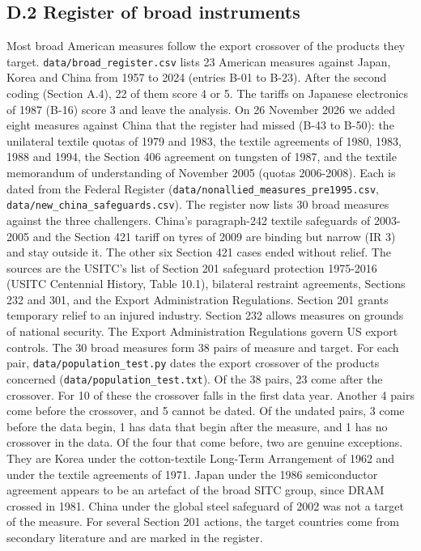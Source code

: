 \hypertarget{d.2-register-of-broad-instruments}{%
\subsection*{D.2 Register of broad
instruments}\label{d.2-register-of-broad-instruments}}

Most broad American measures follow the export crossover of the products
they target. \texttt{data/\allowbreak{}broad\_\allowbreak{}register.csv} lists 23 American
measures against Japan, Korea and China from 1957 to 2024 (entries B-01
to B-23). After the second coding (Section A.4), 22 of them score 4 or
5. The tariffs on Japanese electronics of 1987 (B-16) score 3 and leave
the analysis. On 26 November 2026 we added eight measures against China
that the register had missed (B-43 to B-50): the unilateral textile
quotas of 1979 and 1983, the textile agreements of 1980, 1983, 1988 and
1994, the Section 406 agreement on tungsten of 1987, and the textile
memorandum of understanding of November 2005 (quotas 2006-2008). Each is
dated from the Federal Register
(\texttt{data/\allowbreak{}nonallied\_\allowbreak{}measures\_\allowbreak{}pre1995.csv},
\texttt{data/\allowbreak{}new\_\allowbreak{}china\_\allowbreak{}safeguards.csv}). The register now lists 30
broad measures against the three challengers. China's paragraph-242
textile safeguards of 2003-2005 and the Section 421 tariff on tyres of
2009 are binding but narrow (IR 3) and stay outside it. The other six
Section 421 cases ended without relief. The sources are the USITC's list
of Section 201 safeguard protection 1975-2016 (USITC Centennial History,
Table 10.1), bilateral restraint agreements, Sections 232 and 301, and
the Export Administration Regulations. Section 201 grants temporary
relief to an injured industry. Section 232 allows measures on grounds of
national security. The Export Administration Regulations govern US
export controls. The 30 broad measures form 38 pairs of measure and
target. For each pair, \texttt{data/\allowbreak{}population\_\allowbreak{}test.py} dates the
export crossover of the products concerned
(\texttt{data/\allowbreak{}population\_\allowbreak{}test.txt}). Of the 38 pairs, 23 come after the
crossover. For 10 of these the crossover falls in the first data year.
Another 4 pairs come before the crossover, and 5 cannot be dated. Of the
undated pairs, 3 come before the data begin, 1 has data that begin after
the measure, and 1 has no crossover in the data. Of the four that come
before, two are genuine exceptions. They are Korea under the
cotton-textile Long-Term Arrangement of 1962 and under the textile
agreements of 1971. Japan under the 1986 semiconductor agreement appears
to be an artefact of the broad SITC group, since DRAM crossed in 1981.
China under the global steel safeguard of 2002 was not a target of the
measure. For several Section 201 actions, the target countries come from
secondary literature and are marked in the register.

